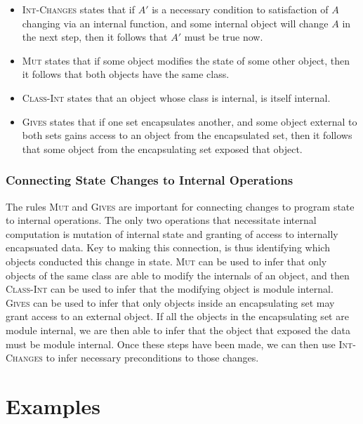 \documentclass[12pt]{article}
\numberwithin{case}{lemma}
\numberwithin{case}{theorem}
\numberwithin{subcase}{case}
\begin{document}
{{\begin{itemize}
\textsc{Calls-Recv} and \textsc{Calls-Args} state that if an object
makes an internal method call, then it follows that that object has access to both 
the receiver and the arguments of that method call (the same is not true of method 
calls to external objects, due to the modified definition for method calls defined
in Section \ref{s:ext_meth}).
\item
\textsc{Int-Changes} states that if $A'$ is a necessary condition to satisfaction of $A$ changing
via an internal function, and some internal object will change $A$ in the next step, 
then it follows that $A'$ must be true now.
\item
\textsc{Mut} states that if some object modifies the state of some other object, then it 
follows that both objects have the same class.
\item
\textsc{Class-Int} states that an object whose class is internal, is itself internal.
\item
\textsc{Gives} states that if one set encapsulates another, and some object external to 
both sets gains access to an object from the encapsulated set, then it follows that some
object from the encapsulating set exposed that object.
\end{itemize}

\subsubsection*{Connecting State Changes to Internal Operations}
The rules \textsc{Mut} and \textsc{Gives} are important for connecting changes to 
program state to internal operations. The only two operations that necessitate 
internal computation is mutation of internal state and granting of access to 
internally encapsuated data. Key to making this connection, is thus identifying 
which objects conducted this change in state. \textsc{Mut} can be used to infer 
that only objects of the same class are able to modify the internals of an object, 
and then \textsc{Class-Int} can be used to infer that the modifying object is 
module internal. \textsc{Gives} can be used to infer that only objects inside an 
encapsulating set may grant access to an external object. If all the objects 
in the encapsulating set are module internal, we are then able to infer that the 
object that exposed the data must be module internal. Once these steps have been
made, we can then use \textsc{Int-Changes} to infer necessary preconditions to 
those changes.
}
}


\section{Examples}
\end{document}
